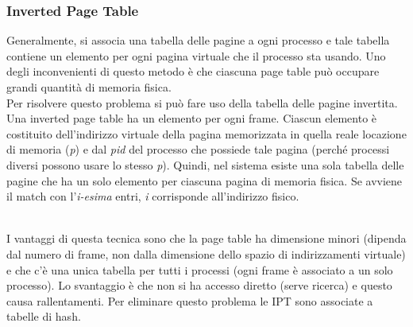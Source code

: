 \documentclass{article}
\begin{document}
			\subsubsection{Inverted Page Table}
				Generalmente, si associa una tabella delle pagine a ogni processo e tale tabella contiene un elemento per ogni pagina virtuale che il processo sta usando. Uno degli inconvenienti di questo metodo è che ciascuna page table può occupare grandi quantità di memoria fisica.
				\\Per risolvere questo problema si può fare uso della tabella delle pagine invertita. Una inverted page table ha un elemento per ogni frame. Ciascun elemento è costituito dell’indirizzo virtuale della pagina memorizzata in quella reale locazione di memoria (\textit{p}) e dal \textit{pid} del processo che possiede tale pagina (perché processi diversi possono usare lo stesso \textit{p}). Quindi, nel sistema esiste una sola tabella delle pagine che ha un solo elemento per ciascuna pagina di memoria fisica. Se avviene il match con l'\textit{i-esima} entri, \textit{i} corrisponde all'indirizzo fisico.
				\begin{figure}[ht!]
				\end{figure}
				\\I vantaggi di questa tecnica sono che la page table ha dimensione minori (dipenda dal numero di frame, non dalla dimensione dello spazio di indirizzamenti virtuale) e che c'è una unica tabella per tutti i processi (ogni frame è associato a un solo processo). Lo svantaggio è che non si ha accesso diretto (serve ricerca) e questo causa rallentamenti. Per eliminare questo problema le IPT sono associate a tabelle di hash.
				\begin{figure}[ht!]
				\end{figure}
				
\end{document}
